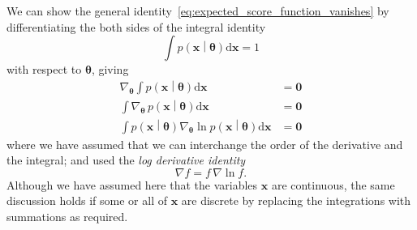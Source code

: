\documentclass[12pt,a4paper]{article}
\begin{document}
We can show the general identity~\eqref{eq:expected_score_function_vanishes}
by differentiating the both sides of the integral identity
\begin{equation}
\int p\left(\mathbf{x}\middle|\bm{\theta}\right) \mathrm{d}\mathbf{x} = 1
\end{equation}
with respect to $\bm{\theta}$, giving
\begin{align}
\nabla_{\bm{\theta}} \int p\left(\mathbf{x}\middle|\bm{\theta}\right) \mathrm{d}\mathbf{x}
&= \mathbf{0}
\label{eq:differentiating_integral_identity_wrt_parameters}
\\
\int \nabla_{\bm{\theta}} \, p\left(\mathbf{x}\middle|\bm{\theta}\right) \mathrm{d}\mathbf{x}
&= \mathbf{0} \\
\int p\left(\mathbf{x}\middle|\bm{\theta}\right)
\nabla_{\bm{\theta}} \ln p\left(\mathbf{x}\middle|\bm{\theta}\right) \mathrm{d}\mathbf{x}
&= \mathbf{0}
\end{align}
where we have assumed that we can interchange the order of the derivative and the integral;
and used the \emph{log derivative identity}
\begin{equation}
\nabla f = f \, \nabla \ln f .
\end{equation}
Although we have assumed here that the variables $\mathbf{x}$ are continuous,
the same discussion holds if some or all of $\mathbf{x}$ are discrete
by replacing the integrations with summations as required.
\end{document}
